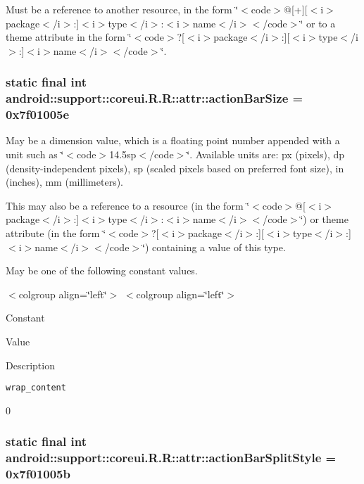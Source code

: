 Must be a reference to another resource, in the form \char`\"{}$<$code$>$@\mbox{[}+\mbox{]}\mbox{[}$<$i$>$package$<$/i$>$:\mbox{]}$<$i$>$type$<$/i$>$:$<$i$>$name$<$/i$>$$<$/code$>$\char`\"{} or to a theme attribute in the form \char`\"{}$<$code$>$?\mbox{[}$<$i$>$package$<$/i$>$:\mbox{]}\mbox{[}$<$i$>$type$<$/i$>$:\mbox{]}$<$i$>$name$<$/i$>$$<$/code$>$\char`\"{}. \hypertarget{classandroid_1_1support_1_1coreui_1_1_r_1_1attr_ba823cbaf68eef0ce8fc7151e3385abc}{
\subsubsection[{actionBarSize}]{\setlength{\rightskip}{0pt plus 5cm}static final int android::support::coreui.R.R::attr::actionBarSize = 0x7f01005e}}
\label{classandroid_1_1support_1_1coreui_1_1_r_1_1attr_ba823cbaf68eef0ce8fc7151e3385abc}


May be a dimension value, which is a floating point number appended with a unit such as \char`\"{}$<$code$>$14.5sp$<$/code$>$\char`\"{}. Available units are: px (pixels), dp (density-independent pixels), sp (scaled pixels based on preferred font size), in (inches), mm (millimeters). 

This may also be a reference to a resource (in the form \char`\"{}$<$code$>$@\mbox{[}$<$i$>$package$<$/i$>$:\mbox{]}$<$i$>$type$<$/i$>$:$<$i$>$name$<$/i$>$$<$/code$>$\char`\"{}) or theme attribute (in the form \char`\"{}$<$code$>$?\mbox{[}$<$i$>$package$<$/i$>$:\mbox{]}\mbox{[}$<$i$>$type$<$/i$>$:\mbox{]}$<$i$>$name$<$/i$>$$<$/code$>$\char`\"{}) containing a value of this type. 

May be one of the following constant values. \begin{TabularC}{0}
\hline
\end{TabularC}
$<$colgroup align=\char`\"{}left\char`\"{}$>$ $<$colgroup align=\char`\"{}left\char`\"{}$>$ 

Constant

Value

Description 

{\tt wrap\_\-content}

0\hypertarget{classandroid_1_1support_1_1coreui_1_1_r_1_1attr_d563a4ebe7eada2ae9350468fefaa7e7}{
\subsubsection[{actionBarSplitStyle}]{\setlength{\rightskip}{0pt plus 5cm}static final int android::support::coreui.R.R::attr::actionBarSplitStyle = 0x7f01005b}}
\label{classandroid_1_1support_1_1coreui_1_1_r_1_1attr_d563a4ebe7eada2ae9350468fefaa7e7}



